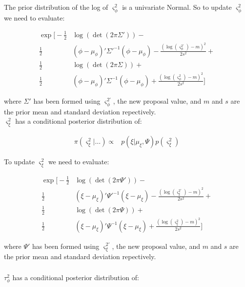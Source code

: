 \documentclass{article}
\begin{document}
The prior distribution of the log of $\varsigma^2_\phi$ is a univariate Normal. So to update $\varsigma^2_\phi$ we need to evaluate:

\begin{align}
\exp \Bigg[ - \frac{1}{2}  & \log(\det(2 \pi \Sigma')) - \nonumber \\
\frac{1}{2} &  (\phi - \mu_\phi)' \Sigma'^{-1} (\phi - \mu_\phi) -
 \frac{(\log(\varsigma^{2'}_\phi) - m)^2}{2 s^2} + \nonumber \\
\frac{1}{2}  & \log(\det(2 \pi \Sigma)) + \nonumber \\
\frac{1}{2} & (\phi - \mu_\phi)' \Sigma^{-1} (\phi - \mu_\phi) + \frac{(\log(\varsigma^2_\phi) - m)^2}{2 s^2} \Bigg] \label{3eq:2vs1}
\end{align}

where $\Sigma'$ has been formed using $\varsigma^{2'}_\phi$, the new proposal value, and $m$ and $s$ are the prior mean and standard deviation repectively. \\

$\varsigma^2_\xi$ has a conditional posterior distribution of:

\begin{align*}
\pi(\varsigma^2_\xi | \dots ) \propto & p(\xi | \mu_\xi, \Psi) p(\varsigma^2_\xi)
\end{align*}

To update $\varsigma^2_\xi$ we need to evaluate:

\begin{align}
\exp \Bigg[ -\frac{1}{2} & \log(\det(2 \pi \Psi')) - \nonumber \\
\frac{1}{2} & (\xi - \mu_\xi)' \Psi'^{-1} (\xi - \mu_\xi) - \frac{(\log(\varsigma^{2'}_\xi) - m)^2}{2 s^2} + \nonumber \\
\frac{1}{2} & \log(\det(2 \pi \Psi)) +\nonumber \\
\frac{1}{2} & (\xi - \mu_\xi)' \Psi^{-1} (\xi - \mu_\xi) + \frac{(\log(\varsigma^2_\xi) - m)^2}{2 s^2} \Bigg] \label{3eq:2vs2}
\end{align}

where $\Psi'$ has been formed using $\varsigma^{2'}_\xi$, the new proposal value, and $m$ and $s$ are the prior mean and standard deviation repectively. \\

\subsubsection*{}

$\tau^2_\phi$ has a conditional posterior distribution of:
\end{document}
